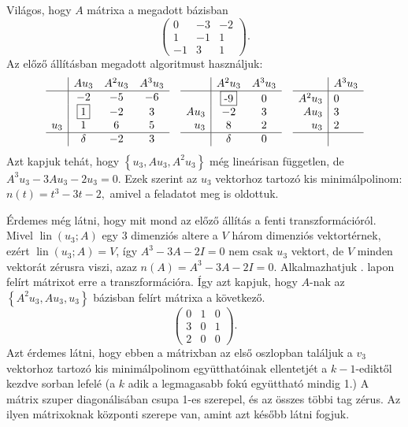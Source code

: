 \documentclass[a4paper, showtrims]{memoir}
\theoremstyle{plain}
\theoremstyle{remark}
\theoremstyle{definition}
\DeclareMathOperator{\lin}{lin}
\begin{document}
Világos, hogy $A$ mátrixa a megadott bázisban
\[
    \begin{pmatrix}
        0&-3&-2\\
        1&-1&1\\
        -1&3&1
    \end{pmatrix}.
\]
Az előző állításban megadott algoritmust használjuk:
\[
\begin{array}{r|ccc}
	     & Au_3        & A^2u_3 & A^3u_3\\
	\hline
	     & -2          &     -5 &     -6\\
         &\framebox{1} &     -2 &      3\\
	u_3  &  1          &      6 &      5\\
	\hline
	     &\delta       &     -2 &      3
\end{array}
\quad
\begin{array}{r|cc}
	     &  A^2u_3      & A^3u_3\\
	\hline
        &\framebox{-9} &     0 \\
	Au_3 &      -2      &     3 \\
	u_3  &       8      &     2 \\
	\hline
	     &\delta        &     0
\end{array}
\quad
\begin{array}{r|l}
	     &A^3u_3\\
	\hline
   A^2u_3&    0 \phantom{\framebox{0}}\\
	Au_3 &    3 \\
	u_3  &    2 \\
	\hline
         &\phantom{\delta}
\end{array}
\]
Azt kapjuk tehát, hogy
\(
	\left\{ u_3,Au_3,A^2u_3\right\}
    \)
még lineárisan független, de
\(
A^3u_3-3Au_3-2u_3=0.
\)
Ezek szerint az $u_3$ vektorhoz tartozó kis minimálpolinom:
\(
n\left( t \right)=t^3-3t-2,
\)
amivel a feladatot meg is oldottuk.

Érdemes még látni, hogy mit mond az előző állítás a fenti transzformációról.
Mivel $\lin\left( u_3;A \right)$ egy 3 dimenziós altere a $V$ három dimenziós vektortérnek,
ezért $\lin\left( u_3;A \right)=V$, így $A^{3}-3A-2I=0$ nem csak $u_3$ vektort, de $V$ minden vektorát zérusra viszi,
azaz $n\left( A \right)=A^3-3A-2I=0$.
Alkalmazhatjuk \aazt{\pageref{ar:elsomegjelenes}}. lapon felírt mátrixot erre a transzformációra.
Így azt kapjuk, hogy $A$-nak az $\left\{A^2u_3,Au_3,u_3\right\}$ bázisban felírt mátrixa a következő.
\[
    \begin{pmatrix}
        0&1&0\\
        3&0&1\\
        2&0&0
    \end{pmatrix}.
\]
Azt érdemes látni, hogy ebben a mátrixban az első oszlopban találjuk a $v_3$ vektorhoz tartozó kis minimálpolinom együtthatóinak ellentetjét
a $k-1$-ediktől kezdve sorban lefelé (a $k$ adik a legmagasabb fokú együttható mindig 1.)
A mátrix szuper diagonálisában csupa 1-es szerepel, és az összes többi tag zérus. 
Az ilyen mátrixoknak központi szerepe van, amint azt később látni fogjuk.
\end{document}
